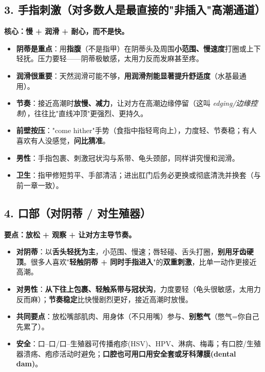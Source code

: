 \documentclass[12pt,UTF8,openany]{ctexbook}
\begin{document}
\subsection*{3. 手指刺激（对多数人是最直接的"非插入"高潮通道）}

\textbf{核心：慢 + 润滑 + 耐心，而不是快。}

\begin{itemize}[leftmargin=2em,itemsep=0.3em]
  \item \textbf{阴蒂是重点}：用\textbf{指腹}（不是指甲）在阴蒂头及周围\textbf{小范围、慢速度}打圈或上下轻抚。压力要轻——阴蒂极敏感，太用力反而发麻甚至疼。
  \item \textbf{润滑很重要}：天然润滑可能不够，\textbf{用润滑剂能显著提升舒适度}（水基最通用）。
  \item \textbf{节奏}：接近高潮时\textbf{放慢、减力}，让对方在高潮边缘停留（这叫 \emph{edging/边缘控制}），往往比"直线冲顶"更强烈、更持久。
  \item \textbf{前壁按压}："come hither"手势（食指中指轻弯向上），力度轻、节奏稳；有人喜欢有人没感觉，\textbf{问比猜准}。
  \item \textbf{男性}：手指包裹、刺激冠状沟与系带、龟头颈部，同样讲究慢和润滑。
  \item \textbf{卫生}：指甲修短剪平、手部清洁；进出肛门后务必更换或彻底清洗并换套（与前一章一致）。
\end{itemize}

\subsection*{4. 口部（对阴蒂 / 对生殖器）}

\textbf{要点：放松 + 观察 + 让对方主导节奏。}

\begin{itemize}[leftmargin=2em,itemsep=0.3em]
  \item \textbf{对阴蒂}：以\textbf{舌头轻抚为主}，小范围、慢速；唇轻碰、舌头打圈，\textbf{别用牙齿硬顶}。很多人喜欢"\textbf{轻触阴蒂 + 同时手指进入}"的\textbf{双重刺激}，比单一动作更接近高潮。
  \item \textbf{对男性}：\textbf{从下往上包裹、轻触系带与冠状沟}，力度要轻（龟头很敏感，太用力反而麻）；\textbf{节奏稳定}比快慢剧烈更好，接近高潮时放慢。
  \item \textbf{共同要点}：放松嘴部肌肉、用身体（不只用嘴）参与、\textbf{别憋气}（憋气=你自己先累了）。
  \item \textbf{安全}：口--口/口--生殖器可传播疱疹(HSV)、HPV、淋病、梅毒；有口腔/生殖器溃疡、疱疹活动时避免；\textbf{口腔也可用口用安全套或牙科薄膜(dental dam)}。
\end{itemize}
\end{document}
